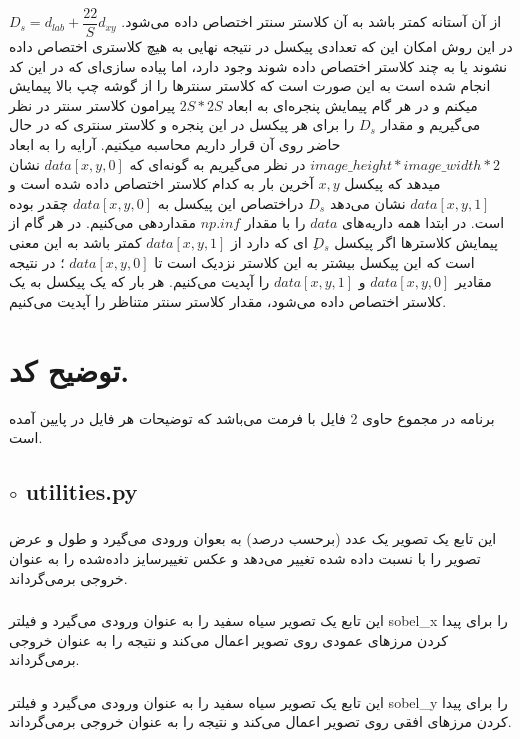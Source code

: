 \documentclass[a4paper,12pt]{article}
\begin{document}
$ D_s = d_{lab} + \dfrac{22}{S}d_{xy} $
از آن آستانه کمتر باشد به آن کلاستر سنتر اختصاص داده می‌شود. در این روش امکان این که تعدادی پیکسل در نتیجه نهایی به هیچ کلاستری اختصاص داده نشوند یا به چند کلاستر اختصاص داده شوند وجود دارد، اما پیاده سازی‌ای که در این کد انجام شده است به این صورت است که کلاستر سنترها را از گوشه چپ بالا پیمایش میکنم و در هر گام پیمایش پنجره‌ای به ابعاد $ 2S *‌2S $ پیرامون کلاستر سنتر در نظر می‌گیریم و مقدار $ D_s $ را برای هر پیکسل در این پنجره و کلاستر سنتری که در حال حاضر روی آن قرار داریم محاسبه میکنیم. آرایه‌
 را به ابعاد 
$ image\_height *‌ image\_width *‌ 2 $
در نظر می‌گیریم به گونه‌ای که $ data[x,y,0] $ نشان‌ میدهد که پیکسل $ x,y $ آخرین بار به کدام کلاستر اختصاص داده شده است و $ data[x,y,1] $ نشان می‌دهد $ D_s $ دراختصاص این پیکسل به 
$ data[x,y,0]$
چقدر بوده است. در ابتدا همه داریه‌های $ data $ را با مقدار $ np.inf $ مقداردهی می‌کنیم. در  هر گام از پیمایش کلاسترها اگر پیکسل $ ِD_s $ ای که دارد از $ data[x,y,1] $ 
کمتر باشد به این معنی است که این پیکسل بیشتر به این کلاستر نزدیک است تا $ data[x,y,0] $ ؛ در نتیجه مقادیر 
$ data[x,y,0] $
و
$ data[x,y,1] $
را آپدیت می‌کنیم. هر بار که یک پیکسل به یک کلاستر اختصاص داده می‌شود، مقدار کلاستر سنتر متناظر را آپدیت ‌می‌کنیم.



\section*{توضیح کد.}
برنامه در مجموع حاوی 2 فایل با فرمت
می‌باشد که توضیحات هر فایل در پایین آمده است.
\subsection*{$\circ$ utilities.py}
\subsubsection*{}
این  تابع یک تصویر یک عدد (‌برحسب درصد) به بعوان ورودی می‌گیرد و طول و عرض تصویر را با نسبت داده شده تغییر می‌دهد و عکس تغییرسایز داده‌شده را به عنوان خروجی بر‌می‌گرداند.
\subsubsection*{}
این تابع یک تصویر سیاه سفید را به عنوان ورودی می‌گیرد و فیلتر sobel\_x را برای پیدا کردن مرزهای عمودی روی تصویر اعمال می‌کند و نتیجه را به عنوان خروجی بر‌می‌گرداند.
\subsubsection*{}
این تابع یک تصویر سیاه سفید را به عنوان ورودی می‌گیرد و فیلتر sobel\_y را برای پیدا کردن مرزهای افقی روی تصویر اعمال می‌کند و نتیجه را به عنوان خروجی بر‌می‌گرداند.
\end{document}
